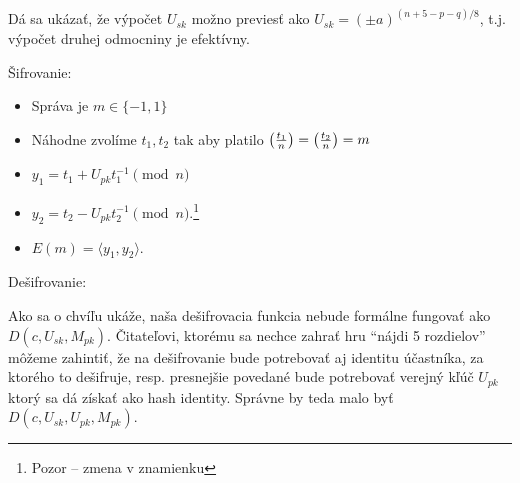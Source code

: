 \begin{poznamka}
    Dá sa ukázať, že výpočet $U_{sk}$ možno previesť ako
    $U_{sk} = (\pm a)^{(n + 5 - p - q)/8}$, t.j. výpočet
    druhej odmocniny je efektívny.
\end{poznamka}

\noindent
Šifrovanie:
\begin{itemize}
    \item Správa je $m\in\{-1,1\}$
    \item Náhodne zvolíme $t_1,t_2$ tak aby platilo
            $\left( \frac{t_1}{n} \right) = \left( \frac{t_2}{n} \right) = m$
    \item $y_1 = t_1 + U_{pk} t_1^{-1} \pmod{n}$
    \item $y_2 = t_2 - U_{pk} t_2^{-1} \pmod{n}$.\footnote{
            Pozor -- zmena v znamienku}
    \item $E(m) = \langle y_1, y_2 \rangle$.
\end{itemize}


\noindent
Dešifrovanie:

\begin{poznamka}
    Ako sa o chvíľu ukáže, naša dešifrovacia funkcia
    nebude formálne fungovať ako $D(c,U_{sk}, M_{pk})$.
    Čitateľovi, ktorému sa nechce zahrať hru ``nájdi 5 rozdielov''
    môžeme zahintiť, že na dešifrovanie bude potrebovať aj identitu
    účastníka, za ktorého to dešifruje, resp. presnejšie povedané bude
    potrebovať verejný kľúč $U_{pk}$ ktorý sa dá získať ako hash
    identity. Správne by teda malo byť $D(c,U_{sk},U_{pk}, M_{pk})$.
\end{poznamka}

